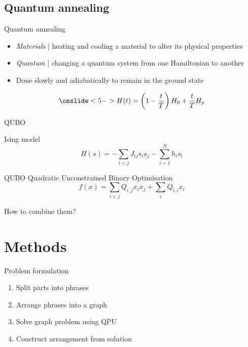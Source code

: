 \documentclass[handout]{beamer}
\begin{document}
\subsection{Quantum annealing}

\begin{frame}{Quantum annealing}
    \begin{itemize}
        \item<2-> \textit{Materials} | heating and cooling a material to alter its physical properties
        \item<3-> \textit{Quantum} | changing a quantum system from one Hamiltonian to another
        \item<4-> Done slowly and adiabatically to remain in the ground state
    \end{itemize}
    \vfill
    \begin{equation*}
        \onslide<5->{H(t)=\left(1- \frac{t}{T}\right)H_0 + \frac{t}{T}H_p}
    \end{equation*}
\end{frame}

\begin{frame}{QUBO}
    \begin{exampleblock}{Ising model}
        \begin{equation*}
            H(s) = -\sum_{i<j}J_{ij}s_i s_j - \sum_{i=1}^{N}h_i s_i
        \end{equation*}
    \end{exampleblock}

    \begin{alertblock}{QUBO}
        \vspace{0.5em}
        Quadratic Unconstrained Binary Optimisation
        \begin{equation*}
            f(x)=\sum_{i<j}Q_{i,j}x_ix_j + \sum_iQ_{i,i}x_i
        \end{equation*}
    \end{alertblock}
\end{frame}

\begin{frame}[standout]
    \centering
    How to combine them?
\end{frame}

\section{Methods}

\begin{frame}{Problem formulation}
    \begin{enumerate}
        \item Split parts into phrases
        \item Arrange phrases into a graph
        \item Solve graph problem using QPU
        \item Construct arrangement from solution
    \end{enumerate}
\end{frame}
\end{document}
